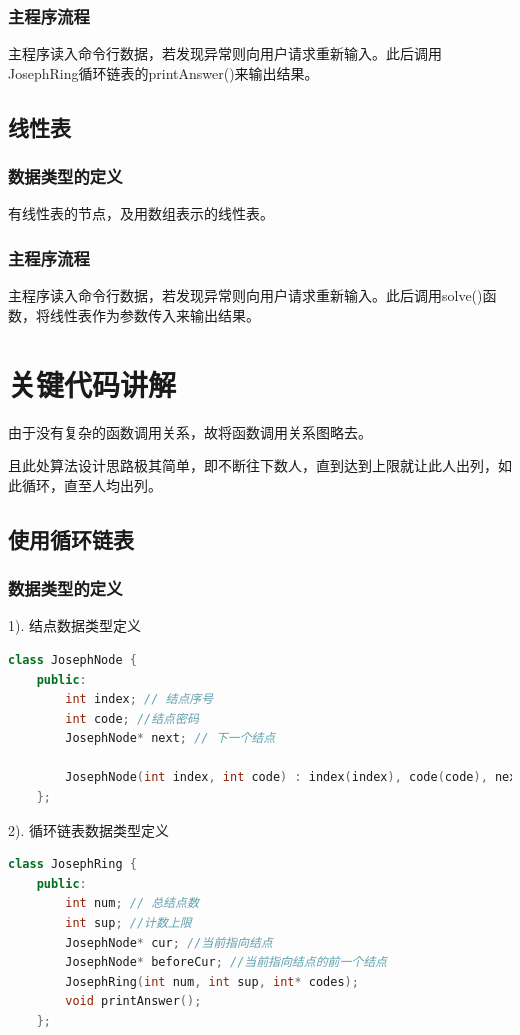 \documentclass[UTF8]{article}
\begin{document}
	\subsubsection{主程序流程}
	主程序读入命令行数据，若发现异常则向用户请求重新输入。此后调用JosephRing循环链表的printAnswer()来输出结果。
	
	\subsection{线性表}
	\subsubsection{数据类型的定义}
	有线性表的节点，及用数组表示的线性表。
	\subsubsection{主程序流程}
	主程序读入命令行数据，若发现异常则向用户请求重新输入。此后调用solve()函数，将线性表作为参数传入来输出结果。
	
	
	\section{关键代码讲解}
	由于没有复杂的函数调用关系，故将函数调用关系图略去。\par
	且此处算法设计思路极其简单，即不断往下数人，直到达到上限就让此人出列，如此循环，直至人均出列。
	\subsection{使用循环链表}
	\subsubsection{数据类型的定义}
	1). 结点数据类型定义
	\begin{lstlisting}[language=C++]
	class JosephNode {
	public:
		int index; // 结点序号
		int code; //结点密码
		JosephNode* next; // 下一个结点
		
		JosephNode(int index, int code) : index(index), code(code), next(nullptr) {};
	};
	\end{lstlisting}
	2). 循环链表数据类型定义
	\begin{lstlisting}[language=C++]
	class JosephRing {
	public:
		int num; // 总结点数
		int sup; //计数上限
		JosephNode* cur; //当前指向结点
		JosephNode* beforeCur; //当前指向结点的前一个结点
		JosephRing(int num, int sup, int* codes);
		void printAnswer();
	};
	\end{lstlisting} 
\end{document}
